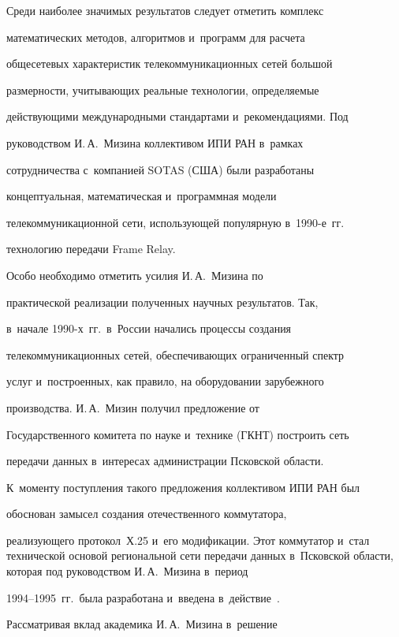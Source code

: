 Среди наиболее значимых результатов следует отметить комплекс


математических методов, алгоритмов и~программ для расчета


общесетевых характеристик телекоммуникационных сетей большой


размерности, учитывающих реальные технологии, определяемые


действующими международными стандартами и~рекомендациями. Под


руководством И.\,А.~Мизина коллективом ИПИ РАН в~рамках


сотрудничества с~компанией SOTAS (США) были разработаны


концептуальная, математическая и~программная модели


телекоммуникационной сети, использующей популярную в~1990-е~гг.\


технологию передачи Frame Relay.





     Особо необходимо отметить усилия И.\,А.~Мизина по


практической реализации полученных научных результатов. Так,


в~начале 1990-х~гг.\ в~России начались процессы создания


телекоммуникационных сетей, обеспечивающих ограниченный спектр


услуг и~построенных, как правило, на оборудовании зарубежного


производства. И.\,А.~Мизин получил предложение от


Государственного комитета по науке и~технике (ГКНТ) построить сеть


передачи данных в~интересах администрации Псковской области.


К~моменту поступления такого предложения коллективом ИПИ РАН был


обоснован замысел создания отечественного коммутатора,


реализующего протокол~Х.25 и~его модификации. Этот коммутатор и~стал технической основой региональной сети передачи данных в~Псковской области, которая под руководством И.\,А.~Мизина в~период


1994--1995~гг.\ была разработана и~введена в~действие~\cite{10-miz}.





     Рассматривая вклад академика И.\,А.~Мизина в~решение


